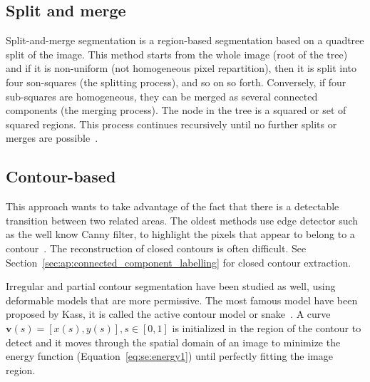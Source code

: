 
\subsection*{Split and merge} %
\label{sub:split_and_merge}
Split-and-merge segmentation is a region-based segmentation based on a quadtree split of the image.
This method starts from the whole image (root of the tree) and if it is non-uniform (not homogeneous pixel repartition), then it is split into four son-squares (the splitting process), and so on so forth.
Conversely, if four sub-squares are homogeneous, they can be merged as several connected components (the merging process).
The node in the tree is a squared or set of squared regions.
This process continues recursively until no further splits or merges are possible~\cite{Kelkar2008Improved,horowitz1976picture}.


\subsection*{Contour-based} %
\label{sub:ap:contour_based}
This approach wants to take advantage of the fact that there is a detectable transition between two related areas.
The oldest methods use edge detector such as the well know Canny filter, to highlight the pixels that appear to belong to a contour~\cite{canny1986computational}.
The reconstruction of closed contours is often difficult.
See Section~\ref{sec:ap:connected_component_labelling} for closed contour extraction.

Irregular and partial contour segmentation have been studied as well, using deformable models that are more permissive.
The most famous model have been proposed by Kass, it is called the active contour model or snake~\cite{Kass1988}.
A curve $\mathbf{v}(s)=[x(s),y(s)], s \in [0,1]$ is initialized in the region of the contour to detect and it moves through the spatial domain of an image to minimize the energy function (Equation~\ref{eq:se:energy1}) until perfectly fitting the image region.

